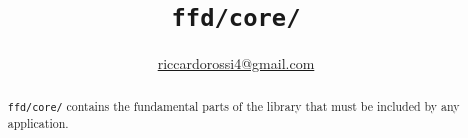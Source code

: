 \documentclass[12pt]{report}
\title{\Huge\texttt{ffd/core/}}
\author{\href{mailto:riccardorossi4@gmail.com}{riccardorossi4@gmail.com}}
\begin{document}
\maketitle
\tableofcontents

\begin{abstract}
\texttt{ffd/core/} contains the fundamental parts of the library that must be included by any application.
\end{abstract}

\end{document}
